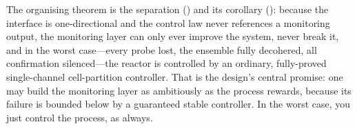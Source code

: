 \documentclass[11pt,a4paper,twocolumn]{article}
\theoremstyle{thmstyle}
\theoremstyle{definition}
\theoremstyle{remark}
\begin{document}
The organising theorem is the separation () and its
corollary (): because the interface is one-directional
and the control law never references a monitoring output, the monitoring
layer can only ever improve the system, never break it, and in the worst
case---every probe lost, the ensemble fully decohered, all confirmation
silenced---the reactor is controlled by an ordinary, fully-proved
single-channel cell-partition controller. That is the design's central
promise: one may build the monitoring layer as ambitiously as the process
rewards, because its failure is bounded below by a guaranteed stable
controller. In the worst case, you just control the process, as always.



\end{document}
